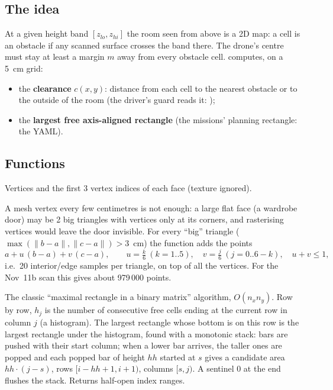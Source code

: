 \subsection{The idea}
At a given height band $[z_{lo}, z_{hi}]$ the room seen from above is a 2D map: a cell is an obstacle if any
scanned surface crosses the band there. The drone's centre must stay at least a margin $m$ away from every
obstacle cell.  computes, on a 5~cm grid:
\begin{itemize}[nosep]
\item the \textbf{clearance} $c(x, y)$: distance from each cell to the nearest obstacle or to the outside of the
  room (the driver's guard reads it: );
\item the \textbf{largest free axis-aligned rectangle} (the missions' planning rectangle: the YAML).
\end{itemize}

\subsection{Functions}

Vertices and the first 3 vertex indices of each face (texture ignored).

A mesh vertex every few centimetres is not enough: a large flat face (a wardrobe door) may be 2 big triangles
with vertices only at its corners, and rasterising vertices would leave the door invisible. For every ``big''
triangle ($\max(\lVert b-a\rVert, \lVert c-a\rVert) > 3$~cm) the function adds the points
\[
a + u\,(b - a) + v\,(c - a),\qquad u = \tfrac k6\ (k = 1..5),\quad v = \tfrac j6\ (j = 0..6-k),\quad u+v \leq 1,
\]
i.e.\ 20 interior/edge samples per triangle, on top of all the vertices. For the Nov~11b scan this gives about
979\,000 points.

The classic ``maximal rectangle in a binary matrix'' algorithm, $O(n_x n_y)$. Row by row, $h_j$ is the number of
consecutive free cells ending at the current row in column $j$ (a histogram). The largest rectangle whose bottom
is on this row is the largest rectangle under the histogram, found with a monotonic stack: bars are pushed with
their start column; when a lower bar arrives, the taller ones are popped and each popped bar of height $hh$
started at $s$ gives a candidate area $hh \cdot (j - s)$, rows $[i-hh+1, i+1)$, columns $[s, j)$. A sentinel 0 at
the end flushes the stack. Returns half-open index ranges.

